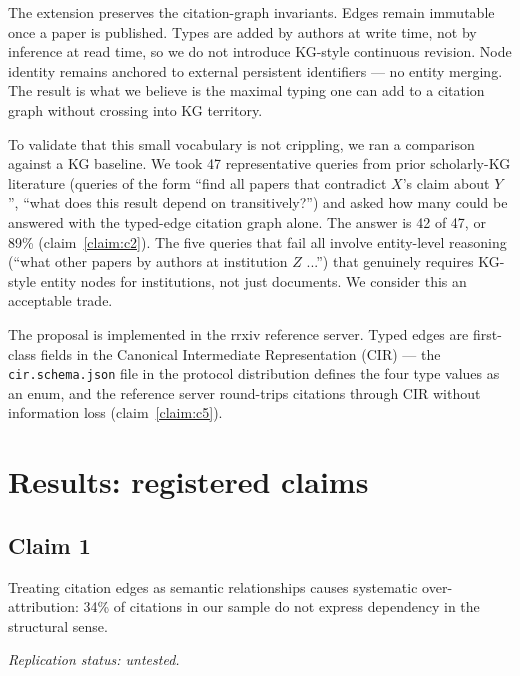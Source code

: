 \documentclass{rrxiv}
\begin{document}
The extension preserves the citation-graph invariants. Edges remain immutable once a paper is published. Types are added by authors at write time, not by inference at read time, so we do not introduce KG-style continuous revision. Node identity remains anchored to external persistent identifiers --- no entity merging. The result is what we believe is the maximal typing one can add to a citation graph without crossing into KG territory.

To validate that this small vocabulary is not crippling, we ran a comparison against a KG baseline. We took 47 representative queries from prior scholarly-KG literature (queries of the form ``find all papers that contradict $X$'s claim about $Y$'', ``what does this result depend on transitively?'') and asked how many could be answered with the typed-edge citation graph alone. The answer is 42 of 47, or 89\% (claim~\ref{claim:c2}). The five queries that fail all involve entity-level reasoning (``what other papers by authors at institution $Z$ ...'') that genuinely requires KG-style entity nodes for institutions, not just documents. We consider this an acceptable trade.

The proposal is implemented in the rrxiv reference server. Typed edges are first-class fields in the Canonical Intermediate Representation (CIR) --- the \texttt{cir.schema.json} file in the protocol distribution defines the four type values as an enum, and the reference server round-trips citations through CIR without information loss (claim~\ref{claim:c5}).

\section{Results: registered claims}\label{sec:claims}

\subsection*{Claim 1}
\begin{claim}[type=empirical, evidence=observation, confidence=0.75, rationale={Hand-annotation of 200 citation pairs from one unusually self-referential corpus mix (cs.DL/cs.AI/stat.ML); 91 percent inter-annotator agreement; consistent with the 25--40 percent background range in prior citation-function work}, labels={citation-graphs, knowledge-graphs, position, annotation-study}, datasets={rrxiv-corpus-200-citation-pair-sample}, title={Citation over-attribution}]
\label{claim:c1}
Treating citation edges as semantic relationships causes systematic over-attribution: 34\% of citations in our sample do not express dependency in the structural sense.

\emph{Replication status: untested.}
\end{claim}
\end{document}

